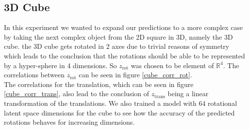 \documentclass[10pt,a4paper]{article}
\newcommand{\rot}{\ensuremath{\text{rot}\xspace}}
\newcommand{\trans}{\ensuremath{\text{trans}\xspace}}
\begin{document}
\subsection{3D Cube}\label{Cube}
In this experiment we wanted to expand our predictions to a more complex case by taking the next complex object from the 2D square in 3D, namely the 3D cube. the 3D cube gets rotated in 2 axes due to trivial reasons of symmetry which leads to the conclusion that the rotations should be able to be represented by a hyper-sphere in 4 dimensions. So $z_{\rot}$ was chosen to be element of $\mathbb{R}^4$. The correlations between $z_{\rot}$ can be seen in figure \ref{cube_corr_rot}. \\
The correlations for the translation, which can be seen in figure \ref{cube_corr_trans}, also lead to the conclusion of $z_{\trans}$ being a linear transformation of the translations. 
We also trained a model with $64$ rotational latent space dimensions for the cube to see how the accuracy of the predicted rotations behaves for increasing dimensions.
\end{document}
